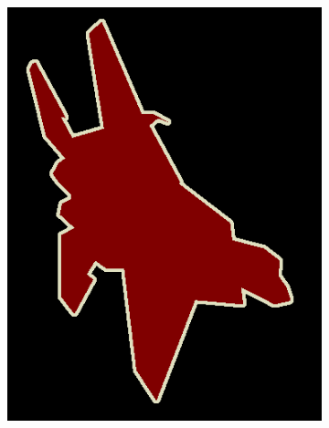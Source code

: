 \documentclass{article} %
\begin{document}
\begin{figure}[t]
\begin{subfigure}[b]{0.19\linewidth}
    \includegraphics[width=\textwidth]{figs/ab/gt/2007_002619}
  \end{subfigure}


\end{figure}
\end{document}
